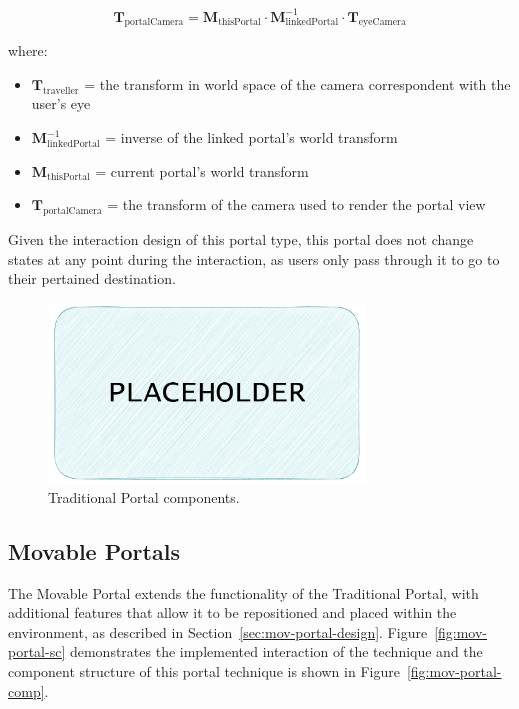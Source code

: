 \[
\mathbf{T}_{\text{portalCamera}} =
\mathbf{M}_{\text{thisPortal}} \cdot
\mathbf{M}_{\text{linkedPortal}}^{-1} \cdot
\mathbf{T}_{\text{eyeCamera}}
\]

where: 

\begin{itemize}
    \item $\mathbf{T}_{\text{traveller}}$ = the transform in world space of the camera correspondent with the user's eye
    \item $\mathbf{M}_{\text{linkedPortal}}^{-1}$ = inverse of the linked portal's world transform
    \item $\mathbf{M}_{\text{thisPortal}}$ = current portal's world transform
    \item $\mathbf{T}_{\text{portalCamera}}$ = the transform of the camera used to render the portal view
\end{itemize}

    
Given the interaction design of this portal type, this portal does not change states at any point during the interaction, as users only 
pass through it to go to their pertained destination.
    
\begin{figure}[t]
    \centering
     \includegraphics[width=0.75\textwidth]{NOVAthesisFiles/Images/placeholder.pdf}
     \caption[Traditional Portal components.]
     {Traditional Portal components.}
     \label{fig:trad-portal-comp}
\end{figure}
    
\subsection{Movable Portals}
\label{sec:mov-portals}

The Movable Portal extends the functionality of the Traditional Portal, with additional features that allow it to be repositioned and 
placed within the environment, as described in Section~\ref{sec:mov-portal-design}. Figure~\ref{fig:mov-portal-sc} demonstrates the implemented interaction of the 
technique and the component structure of this portal technique is shown in Figure~\ref{fig:mov-portal-comp}.

